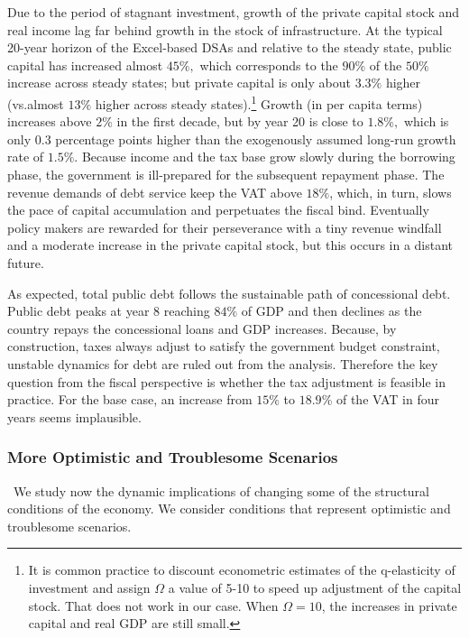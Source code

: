 \documentclass[11pt]{article}
\begin{document}
Due to the period of stagnant investment, growth of the private capital
stock and real income lag far behind growth in the stock of infrastructure.
At the typical 20-year horizon of the Excel-based DSAs and relative to the
steady state, public capital has increased almost $45\%,$ which corresponds
to the $90\%$ of the $50\%$ increase across steady states; but private
capital is only about $3.3\%$ higher (vs.\thinspace almost $13\%$ higher
across steady states).\footnote{%
It is common practice to discount econometric estimates of the q-elasticity
of investment and assign $\Omega $ a value of 5-10 to speed up adjustment of
the capital stock. That does not work in our case. When $\Omega =10$, the
increases in private capital and real GDP are still small.} Growth (in per
capita terms) increases above $2\%$ in the first decade, but by year 20 is
close to $1.8\%,$ which is only $0.3$ percentage points higher than the
exogenously assumed long-run growth rate of $1.5\%.$ Because income and the
tax base grow slowly during the borrowing phase, the government is
ill-prepared for the subsequent repayment phase. The revenue demands of debt
service keep the VAT above $18\%$, which, in turn, slows the pace of capital
accumulation and perpetuates the fiscal bind. Eventually policy makers are
rewarded for their perseverance with a tiny revenue windfall and a moderate
increase in the private capital stock, but this occurs in a distant future.

As expected, total public debt follows the sustainable path of concessional
debt. Public debt peaks at year $8$ reaching $84\%$ of GDP and then declines
as the country repays the concessional loans and GDP increases. Because, by
construction, taxes always adjust to satisfy the government budget
constraint, unstable dynamics for debt are ruled out from the analysis.
Therefore the key question from the fiscal perspective is whether the tax
adjustment is feasible in practice. For the base case, an increase from $%
15\% $ to $18.9\%$ of the VAT in four years seems implausible.

\subsubsection{More Optimistic and Troublesome Scenarios}

\quad\ \thinspace We study now the dynamic implications of changing some of
the structural conditions of the economy. We consider conditions that
represent optimistic and troublesome scenarios.
\end{document}

